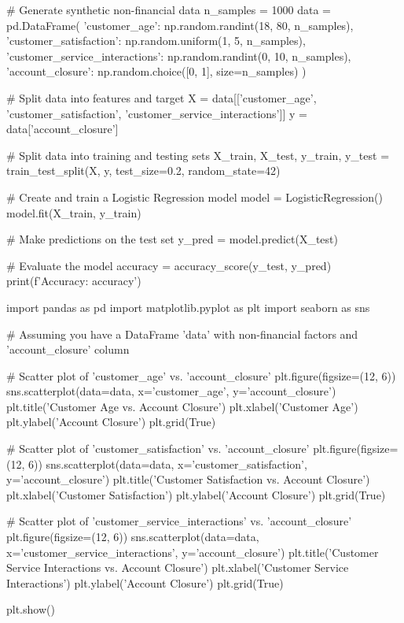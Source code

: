 # Generate synthetic non-financial data
n_samples = 1000
data = pd.DataFrame({
    'customer_age': np.random.randint(18, 80, n_samples),
    'customer_satisfaction': np.random.uniform(1, 5, n_samples),
    'customer_service_interactions': np.random.randint(0, 10, n_samples),
    'account_closure': np.random.choice([0, 1], size=n_samples)
})

# Split data into features and target
X = data[['customer_age', 'customer_satisfaction', 'customer_service_interactions']]
y = data['account_closure']

# Split data into training and testing sets
X_train, X_test, y_train, y_test = train_test_split(X, y, test_size=0.2, random_state=42)

# Create and train a Logistic Regression model
model = LogisticRegression()
model.fit(X_train, y_train)

# Make predictions on the test set
y_pred = model.predict(X_test)

# Evaluate the model
accuracy = accuracy_score(y_test, y_pred)
print(f'Accuracy: {accuracy}')





import pandas as pd
import matplotlib.pyplot as plt
import seaborn as sns

# Assuming you have a DataFrame 'data' with non-financial factors and 'account_closure' column

# Scatter plot of 'customer_age' vs. 'account_closure'
plt.figure(figsize=(12, 6))
sns.scatterplot(data=data, x='customer_age', y='account_closure')
plt.title('Customer Age vs. Account Closure')
plt.xlabel('Customer Age')
plt.ylabel('Account Closure')
plt.grid(True)
 
# Scatter plot of 'customer_satisfaction' vs. 'account_closure'
plt.figure(figsize=(12, 6))
sns.scatterplot(data=data, x='customer_satisfaction', y='account_closure')
plt.title('Customer Satisfaction vs. Account Closure')
plt.xlabel('Customer Satisfaction')
plt.ylabel('Account Closure')
plt.grid(True)
 
# Scatter plot of 'customer_service_interactions' vs. 'account_closure'
plt.figure(figsize=(12, 6))
sns.scatterplot(data=data, x='customer_service_interactions', y='account_closure')
plt.title('Customer Service Interactions vs. Account Closure')
plt.xlabel('Customer Service Interactions')
plt.ylabel('Account Closure')
plt.grid(True)






plt.show()





